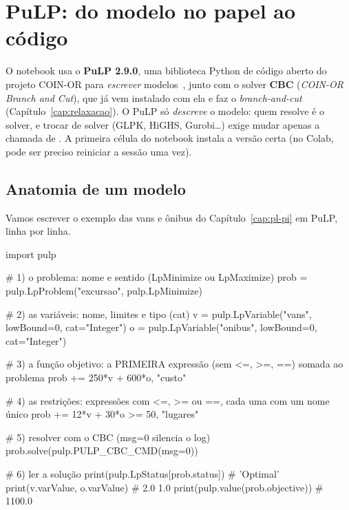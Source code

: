 \chapter{PuLP: do modelo no papel ao código}
\label{cap:pulp}

O notebook usa o \textbf{PuLP 2.9.0}, uma biblioteca Python de código aberto do projeto COIN-OR para
\emph{escrever} modelos~\cite{pulp2011}, junto com o solver \textbf{CBC} (\emph{COIN-OR Branch and Cut}), que já vem
instalado com ela e faz o \emph{branch-and-cut} (Capítulo~\ref{cap:relaxacao}). O PuLP só \emph{descreve} o modelo:
quem resolve é o solver, e trocar de solver (GLPK, HiGHS, Gurobi\ldots) exige mudar apenas a chamada de
. A primeira célula do notebook instala a
versão certa (no Colab, pode ser preciso reiniciar a sessão uma vez).

\section{Anatomia de um modelo}

Vamos escrever o exemplo das vans e ônibus do Capítulo~\ref{cap:pl-pi} em PuLP, linha por linha.

\begin{codigo}
import pulp

# 1) o problema: nome e sentido (LpMinimize ou LpMaximize)
prob = pulp.LpProblem("excursao", pulp.LpMinimize)

# 2) as variáveis: nome, limites e tipo (cat)
v = pulp.LpVariable("vans",   lowBound=0, cat="Integer")
o = pulp.LpVariable("onibus", lowBound=0, cat="Integer")

# 3) a função objetivo: a PRIMEIRA expressão (sem <=, >=, ==) somada ao problema
prob += 250*v + 600*o, "custo"

# 4) as restrições: expressões com <=, >= ou ==, cada uma com um nome único
prob += 12*v + 30*o >= 50, "lugares"

# 5) resolver com o CBC (msg=0 silencia o log)
prob.solve(pulp.PULP_CBC_CMD(msg=0))

# 6) ler a solução
print(pulp.LpStatus[prob.status])          # 'Optimal'
print(v.varValue, o.varValue)              # 2.0 1.0
print(pulp.value(prob.objective))          # 1100.0
\end{codigo}

